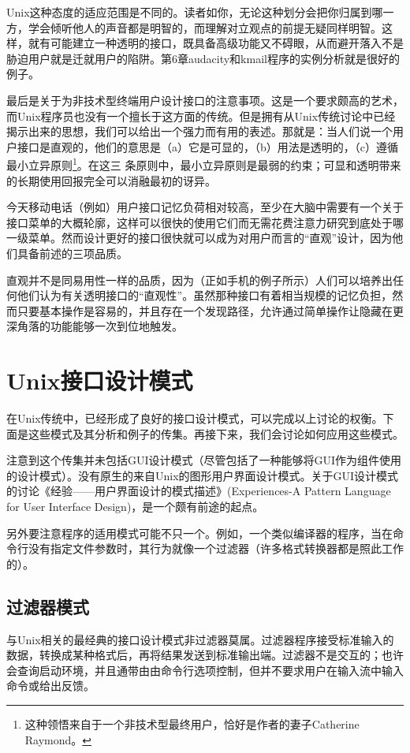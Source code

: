 \documentclass[12pt,oneside]{book}
\begin{document}
Unix这种态度的适应范围是不同的。读者如你，无论这种划分会把你归属到哪一方，学会倾听他人的声音都是明智的，而理解对立观点的前提无疑同样明智。这样，就有可能建立一种透明的接口，既具备高级功能又不碍眼，从而避开落入不是胁迫用户就是迁就用户的陷阱。第6章audacity和kmail程序的实例分析就是很好的例子。

最后是关于为非技术型终端用户设计接口的注意事项。这是一个要求颇高的艺术，而Unix程序员也没有一个擅长于这方面的传统。但是拥有从Unix传统讨论中已经揭示出来的思想，我们可以给出一个强力而有用的表述。那就是：当人们说一个用户接口是直观的，他们的意思是（a）它是可显的，（b）用法是透明的，（c）遵循最小立异原则\footnote{这种领悟来自于一个非技术型最终用户，恰好是作者的妻子Catherine Raymond。}。在这三
条原则中，最小立异原则是最弱的约束；可显和透明带来的长期使用回报完全可以消融最初的讶异。

今天移动电话（例如）用户接口记忆负荷相对较高，至少在大脑中需要有一个关于接口菜单的大概轮廓，这样可以很快的使用它们而无需花费注意力研究到底处于哪一级菜单。然而设计更好的接口很快就可以成为对用户而言的“直观”设计，因为他们具备前述的三项品质。

直观并不是同易用性一样的品质，因为（正如手机的例子所示）人们可以培养出任何他们认为有关透明接口的“直观性”。虽然那种接口有着相当规模的记忆负担，然而只要基本操作是容易的，并且存在一个发现路径，允许通过简单操作让隐藏在更深角落的功能能够一次到位地触发。

\section{Unix接口设计模式}
在Unix传统中，已经形成了良好的接口设计模式，可以完成以上讨论的权衡。下面是这些模式及其分析和例子的传集。再接下来，我们会讨论如何应用这些模式。

注意到这个传集并未包括GUI设计模式（尽管包括了一种能够将GUI作为组件使用的设计模式）。没有原生的来自Unix的图形用户界面设计模式。关于GUI设计模式的讨论《经验——用户界面设计的模式描述》(Experiences-A Pattern Language for User Interface Design)\cite{Coram-Lee}，是一个颇有前途的起点。

另外要注意程序的适用模式可能不只一个。例如，一个类似编译器的程序，当在命令行没有指定文件参数时，其行为就像一个过滤器（许多格式转换器都是照此工作的）。

\subsection{过滤器模式}
与Unix相关的最经典的接口设计模式非过滤器莫属。过滤器程序接受标准输入的数据，转换成某种格式后，再将结果发送到标准输出端。过滤器不是交互的；也许会查询启动环境，并且通带由由命令行选项控制，但并不要求用户在输入流中输入命令或给出反馈。
\end{document}
